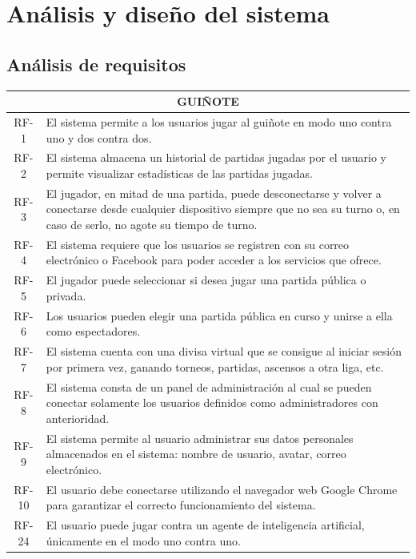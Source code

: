 \section{Análisis y diseño del sistema}
\label{analisis}
\subsection{Análisis de requisitos}
\label{requisitos}

\begin{table}[H]
\centering
\begin{tabular}{|c|p{12cm}|}
\hline
\multicolumn{2}{|c|}{GUIÑOTE} \\ \hline
RF-1 &  El sistema permite a los usuarios jugar al guiñote en modo uno contra uno y dos contra dos. \\ \hline
RF-2 & El sistema almacena un historial de partidas jugadas por el usuario y permite visualizar estadísticas de las partidas jugadas. \\ \hline
RF-3 & El jugador, en mitad de una partida, puede desconectarse y   volver a conectarse desde cualquier dispositivo siempre que no sea su turno o, en caso de serlo, no agote su tiempo de turno. \\ \hline
RF-4 & El sistema requiere que los usuarios se registren con su correo electrónico o Facebook para poder acceder a los servicios que ofrece. \\ \hline
RF-5 & El jugador puede seleccionar si desea jugar una partida pública o privada. \\ \hline
RF-6 & Los usuarios pueden elegir una partida pública en curso y unirse a ella como espectadores. \\ \hline
RF-7 & El sistema cuenta con una divisa virtual que se consigue al iniciar sesión por primera vez, ganando torneos, partidas, ascensos a otra liga, etc. \\ \hline
RF-8 & El sistema consta de un panel de administración al cual se pueden conectar solamente los usuarios definidos como administradores con anterioridad. \\ \hline
RF-9 & El sistema permite al usuario administrar sus datos personales almacenados en el sistema: nombre de usuario, avatar, correo electrónico. \\ \hline
RF-10 & El usuario debe conectarse utilizando el navegador web Google Chrome para garantizar el correcto funcionamiento del sistema. \\ \hline
RF-24 & El usuario puede jugar contra un agente de inteligencia artificial, únicamente en el modo uno contra uno.  \\ \hline

\end{tabular}
\end{table}
